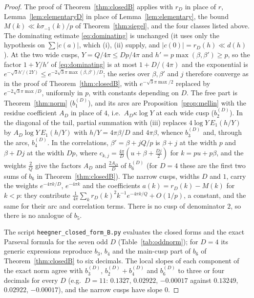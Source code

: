 \documentclass[11pt]{amsart}
\theoremstyle{remark}
\begin{document}
\begin{proof}
The proof of Theorem~\ref{thm:closedB} applies with $r_D$ in place of $r$, Lemma~\ref{lem:elementaryD} in place of Lemma~\ref{lem:elementary}, the bound $M(k)\ll k\sigma_{-1}(k)/p$ of Theorem~\ref{thm:siegel}, and the four classes listed above. The dominating estimate \eqref{eq:dominating} is unchanged (it uses only the hypothesis on $\sum|c(a)|$, which (i), (ii) supply, and $|c(0)|=r_D(h)\ll d(h)$). At the two wide cusps, $Y=Q/4\pi\le Dp/4\pi$ and $h'=p\max(\beta,\beta')\ge p$, so the factor $1+Y/h'$ of \eqref{eq:dominating} is at most $1+D/(4\pi)$ and the exponential is $e^{-\sqrt3h'/(2Y)}\le e^{-2\sqrt3\pi\max(\beta,\beta')/D}$; the series over $\beta,\beta'$ and $j$ therefore converge as in the proof of Theorem~\ref{thm:closedB}, with $e^{-\sqrt3\pi\max/2}$ replaced by $e^{-2\sqrt3\pi\max/D}$, uniformly in $p$, with constants depending on $D$. The free part is Theorem~\ref{thm:norm} ($b_1^{(D)}$), and its arcs are Proposition~\ref{prop:mellin} with the residue coefficient $A_D$ in place of $4$, i.e.\ $A_D\kappa\log Y$ at each wide cusp ($b_2^{(D)}$). In the diagonal of the tail, partial summation with (iii) replaces $4\log Y\,E_1(h/Y)$ by $A_D\log Y\,E_1(h/Y)$ with $h/Y=4\pi\beta/D$ and $4\pi\beta$, whence $b_3^{(D)}$ and, through the arcs, $b_4^{(D)}$. In the correlations, $\beta'=\beta+jQ/p$ is $\beta+j$ at the width $p$ and $\beta+Dj$ at the width $Dp$, where $c_{k,j}=\frac{4\pi}D(u+\beta+\frac{Dj}2)$ for $k=pu+p\beta$, and the weights $\frac2Q$ give the factors $A_D$ and $\frac{2A_D}D$ of $b_6^{(D)}$ (for $D=4$ these are the first two sums of $b_6$ in Theorem~\ref{thm:closedB}). The narrow cusps, widths $D$ and $1$, carry the weights $e^{-4\pi k/D}$, $e^{-4\pi k}$ and the coefficients $a(k)=r_D(k)-M(k)$ for $k<p$: they contribute $\frac1{4\pi}\sum_kr_D(k)^2k^{-1}e^{-4\pi k/Q}+O(1/p)$, a constant, and the same for their arc and correlation terms. There is no cusp of denominator $2$, so there is no analogue of $b_5$.

The script \texttt{heegner\_closed\_form\_B.py} evaluates the closed forms and the exact Parseval formula for the seven odd $D$ (Table~\ref{tab:oddnorm}); for $D=4$ its generic expressions reproduce $b_3$, $b_4$ and the main-cusp part of $b_6$ of Theorem~\ref{thm:closedB} to six decimals. The local slopes of each component of the exact norm agree with $b_3^{(D)}$, $b_2^{(D)}+b_4^{(D)}$ and $b_6^{(D)}$ to three or four decimals for every $D$ (e.g.\ $D=11$: $0.1327$, $0.02922$, $-0.00017$ against $0.13249$, $0.02922$, $-0.00017$), and the narrow cusps have slope $0$.
\end{proof}
\end{document}
